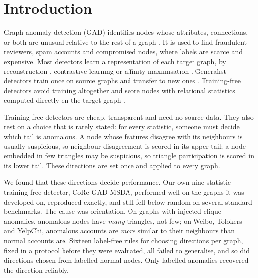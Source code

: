 \documentclass[pdflatex,sn-mathphys-ay]{sn-jnl}
\theoremstyle{plain}
\theoremstyle{remark}
\begin{document}

\maketitle

\section{Introduction}\label{sec:intro}

Graph anomaly detection (GAD) identifies nodes whose attributes, connections, or both are unusual relative to the rest of a graph \citep{akoglu2015graph,ma2023comprehensive}. It is used to find fraudulent reviewers, spam accounts and compromised nodes, where labels are scarce and expensive. Most detectors learn a representation of each target graph, by reconstruction \citep{ding2019deep}, contrastive learning \citep{liu2021cola} or affinity maximisation \citep{qiao2023truncated}. Generalist detectors train once on source graphs and transfer to new ones \citep{niu2025unprompt,qiao2025anomalygfm,liu2024arc}. Training-free detectors avoid training altogether and score nodes with relational statistics computed directly on the target graph \citep{zhao2025freegad,wei2026neighbordiv}.

Training-free detectors are cheap, transparent and need no source data. They also rest on a choice that is rarely stated: for every statistic, someone must decide which tail is anomalous. A node whose features disagree with its neighbours is usually suspicious, so neighbour disagreement is scored in its upper tail; a node embedded in few triangles may be suspicious, so triangle participation is scored in its lower tail. These directions are set once and applied to every graph.

We found that these directions decide performance. Our own nine-statistic training-free detector, CoRe-GAD-MSDA, performed well on the graphs it was developed on, reproduced exactly, and still fell below random on several standard benchmarks. The cause was orientation. On graphs with injected clique anomalies, anomalous nodes have \emph{many} triangles, not few; on Weibo, Tolokers and YelpChi, anomalous accounts are \emph{more} similar to their neighbours than normal accounts are. Sixteen label-free rules for choosing directions per graph, fixed in a protocol before they were evaluated, all failed to generalise, and so did directions chosen from labelled normal nodes. Only labelled anomalies recovered the direction reliably.
\end{document}
